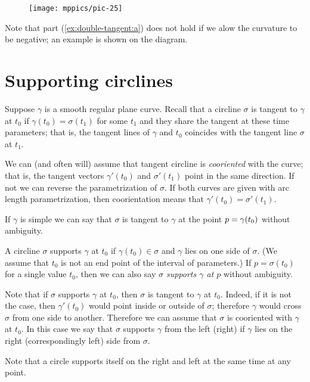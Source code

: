 {

\begin{wrapfigure}{r}{35 mm}
\vskip-4mm
\centering
\texttt{[image: mppics/pic-25]}
\vskip0mm
\end{wrapfigure}

Note that part (\ref{ex:double-tangent:a}) does not hold if we alow the curvature to be negative; an example is shown on the diagram.

}

\section*{Supporting circlines}

Suppose $\gamma$ is a smooth regular plane curve.
Recall that a circline $\sigma$ is tangent to $\gamma$ at $t_0$ if
$\gamma(t_0)=\sigma(t_1)$ for some $t_1$ and they share the tangent at these time parameters;
that is, the tangent lines of $\gamma$ and $t_0$ coincides with the tangent line $\sigma$ at $t_1$.

We can (and often will) assume that tangent circline is \emph{cooriented} with the curve;
that is, the tangent vectors $\gamma'(t_0)$ and $\sigma'(t_1)$ point in the same direction.
If not we can reverse the parametrization of $\sigma$.
If both curves are given with arc length parametrization, then coorientation  means that $\gamma'(t_0)=\sigma'(t_1)$.

If $\gamma$ is simple we can say that $\sigma$ is tangent to $\gamma$ at the point $p\z=\gamma(t_0)$ without ambiguity.


A circline $\sigma$ supports $\gamma$ at $t_0$ if $\gamma(t_0)\in\sigma$
and $\gamma$ lies on one side of $\sigma$.
(We assume that $t_0$ is not an end point of the interval of parameters.)
If $p=\sigma(t_0)$ for a single value $t_0$,
then we can also say \emph{$\sigma$ supports $\gamma$ at $p$} without ambiguity.

Note that if $\sigma$ supports $\gamma$ at $t_0$, then $\sigma$ is tangent to $\gamma$ at $t_0$.
Indeed, if it is not the case, then $\gamma'(t_0)$ would point inside or outside of $\sigma$;
therefore $\gamma$ would cross $\sigma$ from one side to another.
Therefore we can assume that $\sigma$ is cooriented with $\gamma$  at $t_0$.
In this case we say that $\sigma$ supports $\gamma$ from the left (right) if $\gamma$ lies on the right (correspondingly left) side from $\sigma$. 


Note that a circle supports itself on the right and left at the same time at any point.

